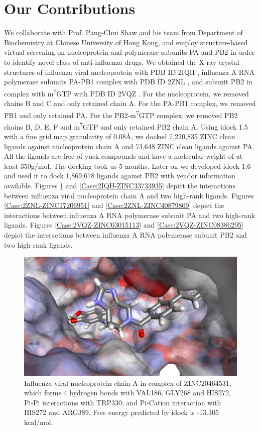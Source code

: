 \section{Our Contributions}

We collaborate with Prof. Pang-Chui Shaw and his team from Department of Biochemistry at Chinese University of Hong Kong, and employ structure-based virtual screening on nucleoprotein and polymerase subunits PA and PB2 in order to identify novel class of anti-influenza drugs. We obtained the X-ray crystal structures of influenza viral nucleoprotein with PDB ID 2IQH \citep{1140}, influenza A RNA polymerase subunits PA-PB1 complex with PDB ID 2ZNL \citep{1141}, and subunit PB2 in complex with m\textsuperscript{7}GTP with PDB ID 2VQZ \citep{1192}. For the nucleoprotein, we removed chains B and C and only retained chain A. For the PA-PB1 complex, we removed PB1 and only retained PA. For the PB2-m\textsuperscript{7}GTP complex, we removed PB2 chains B, D, E, F and m\textsuperscript{7}GTP and only retained PB2 chain A. Using idock 1.5 with a fine grid map granularity of 0.08\AA, we docked 7,220,835 ZINC \citep{532} clean ligands against nucleoprotein chain A and 73,648 ZINC clean ligands against PA. All the ligands are free of yuck compounds and have a molecular weight of at least 350g/mol. The docking took us 5 months. Later on we developed idock 1.6 and used it to dock 1,869,678 ligands against PB2 with vendor information available. Figures \ref{Case:2IQH-ZINC20464531} and \ref{Case:2IQH-ZINC33733935} depict the interactions between influenza viral nucleoprotein chain A and two high-rank ligands. Figures \ref{Case:2ZNL-ZINC17206951} and \ref{Case:2ZNL-ZINC40879809} depict the interactions between influenza A RNA polymerase subunit PA and two high-rank ligands. Figures \ref{Case:2VQZ-ZINC03015113} and \ref{Case:2VQZ-ZINC08386295} depict the interactions between influenza A RNA polymerase subunit PB2 and two high-rank ligands.

\begin{figure}
\centering
\includegraphics[width=\linewidth]{../influenza/2IQH-ZINC20464531.png}
\caption{Influenza viral nucleoprotein chain A in complex of ZINC20464531, which forms 4 hydrogen bonds with VAL186, GLY268 and HIS272, Pi-Pi interactions with TRP330, and Pi-Cation interaction with HIS272 and ARG389. Free energy predicted by idock is -13.305 kcal/mol.}
\label{Case:2IQH-ZINC20464531}
\end{figure}

